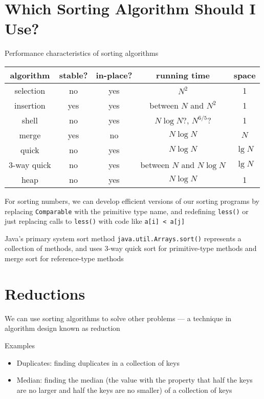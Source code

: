 \documentclass[8pt,a4paper,compress]{beamer}
\begin{document}
\section{Which Sorting Algorithm Should I Use?}
\begin{frame}[fragile]
\pause

Performance characteristics of sorting algorithms
\begin{center}
\begin{tabular}{ccccc}
algorithm & stable? & in-place? & running time & space \\ \hline
selection & no & yes & $N^2$ & 1 \\
insertion & yes & yes & between $N$ and $N^2$ & 1 \\
shell & no & yes & $N\log N$?, $N^{6/5}$? & 1 \\
merge & yes & no & $N\log N$ & $N$ \\
quick & no & yes & $N\log N$ & $\lg N$ \\
3-way quick & no & yes & between $N$ and $N\log N$ & $\lg N$ \\
heap & no & yes & $N\log N$ & 1
\end{tabular} 
\end{center}

\pause
\bigskip

For sorting numbers, we can develop efficient versions of our sorting programs by replacing \lstinline$Comparable$ with the primitive type name, and redefining \lstinline$less()$ or just replacing calls to \lstinline$less()$ with code like \lstinline$a[i] < a[j]$

\pause
\bigskip

Java's primary system sort method  \lstinline$java.util.Arrays.sort()$ represents a collection of methods, and uses 3-way quick sort for primitive-type methods and merge sort for reference-type methods
\end{frame}

\section{Reductions}
\begin{frame}[fragile]
\pause

We can use sorting algorithms to solve other problems --- a technique in algorithm design known as reduction 

\pause
\bigskip

Examples
\begin{itemize}
\pause
\item Duplicates: finding duplicates in a collection of keys

\pause
\item Median: finding the median (the value with the property that half the keys are no larger and half the keys are no smaller) of a collection of keys
\end{itemize}
\end{frame}
\end{document}
